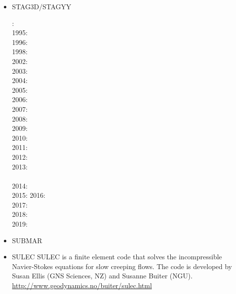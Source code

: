 \begin{itemize}
\item STAG3D/STAGYY  

: \cite{tackley94}\\
1995: \cite{scta95}\\
1996: \cite{tack96}\\
1998: \cite{most98}\cite{thta98}\\
2002: \cite{falt02}\cite{tack02}\\
2003: \cite{taxi03}\\
2004: \cite{xita04b}\cite{xita04}\\
2005: \cite{grlt05}\\
2006: \cite{mita06}\\
2007: \cite{grlt07}\cite{grlt07b}\cite{heta07}\\
2008: \cite{deta08}\cite{hets08}\cite{heta08}\\
2009: \cite{deta09}\cite{natd09}\cite{keta09}\\
2010: \cite{detn10}\cite{nata10}\\
2011: \cite{rota11}\cite{gokg11}\\
2012: \cite{roct12}\cite{crtm12}\cite{cosr13}\cite{deyt12}\cite{dect12}\cite{arta12}\\
2013: \cite{ruts13}\cite{taab13}\\\\
2014: \cite{yadl14}\cite{crta14}\cite{roct14}\cite{cort14}\cite{becr14}\cite{lidt14}\\
2015: \cite{bect15}
2016: \cite{sisc16}\cite{crta16}\\
2017: \cite{cogu17}\cite{pest17}\\
2018: \cite{cosh18}\cite{bofc18}\cite{cold18}\cite{arcf18}\cite{cram18}\cite{crli18}\\
2019: \cite{gult19}\cite{argc19}\cite{deli19}\cite{pact19}\cite{cohf19}\cite{crcm19}

\item SUBMAR

\cite{masr06}
\cite{masp07}
\cite{roms10}


\item SULEC 
SULEC is a finite element code that solves the incompressible Navier-Stokes equations 
for slow creeping flows. The code is developed by Susan Ellis 
(GNS Sciences, NZ) and Susanne Buiter (NGU). 
\url{http://www.geodynamics.no/buiter/sulec.html}


\end{itemize}
